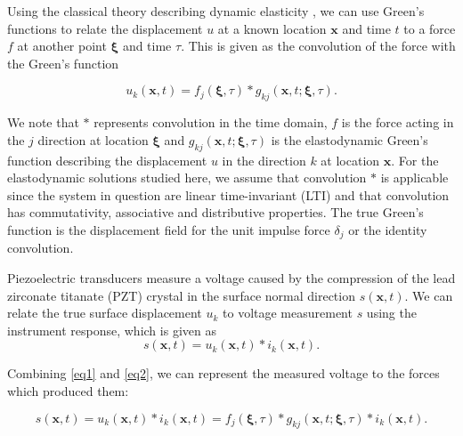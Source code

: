 \documentclass[preprint,3p, 11pt,authoryear]{elsarticle}
\begin{document}
Using the classical theory describing dynamic elasticity \citep{Aki2002}, we can use Green's functions to relate the displacement $u$ at a known location $\mathbf{x}$ and time $t$ to a force $f$ at another point $\mathbf{\xi}$ and time $\tau$. This is given as the convolution of the force with the Green's function

\begin{equation}
\label{eq1}
           u_{k}\left( \mathbf{x}, t \right)  =  
            f_{j}\left( \mathbf{\xi}, \tau \right) \ast 
            g_{kj}\left( \mathbf{x}, t;\mathbf{\xi}, \tau \right).
\end{equation}

\noindent We note that $\ast$ represents convolution in the time domain, $f$ is the force acting in the $j$ direction at location $\mathbf{\xi}$ and $g_{kj}\left( \mathbf{x}, t;\mathbf{\xi}, \tau \right)$ is the elastodynamic Green's function describing the displacement $u$ in the direction $k$ at location $\mathbf{x}$. For the elastodynamic solutions studied here, we assume that convolution $\ast$ is applicable since the system in question are linear time-invariant (LTI) and that convolution has commutativity, associative and distributive properties. The true Green's function is the displacement field for the unit impulse force $\delta_{j}$ or the identity convolution. 

Piezoelectric transducers measure a voltage caused by the compression of the lead zirconate titanate (PZT) crystal in the surface normal direction $s\left( \mathbf{x}, t \right)$. We can relate the true surface displacement $u_{k}$ to voltage measurement $s$ using the instrument response, which is given as
   \begin{equation}
    \label{eq2}
        s\left( \mathbf{x}, t \right) =
            u_{k}\left( \mathbf{x}, t \right) \ast i_{k}\left(\mathbf{x},t \right).
    \end{equation}
    
    \noindent Combining \eqref{eq1} and \eqref{eq2}, we can represent the measured voltage to the forces which produced them:

    \begin{equation}
    \label{eq3}
        s\left( \mathbf{x}, t \right) =
            u_{k}\left( \mathbf{x}, t \right) \ast i_{k}\left(\mathbf{x}, t \right) =  
                f_{j}\left( \mathbf{\xi}, \tau \right) \ast 
                g_{kj}\left( \mathbf{x}, t;\mathbf{\xi}, \tau \right) \ast i_{k}\left(\mathbf{x},  t \right).
    \end{equation}
\end{document}
